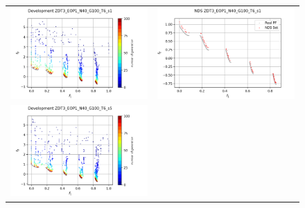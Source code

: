 \begin{figure}[H]
    \centering
    \begin{tabular}{c c}
    \includegraphics[scale=0.5]{figures/ZDT3_EOP1_N40_G100_T6/s1_dev.png} &
    \includegraphics[scale=0.5]{figures/ZDT3_EOP1_N40_G100_T6/s1_nds.png}\\
    \includegraphics[scale=0.5]{figures/ZDT3_EOP1_N40_G100_T6/s5_dev.png} &

\end{tabular}
\end{figure}
